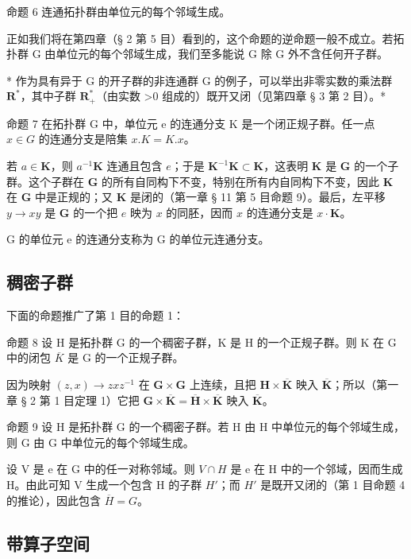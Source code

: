 命题 6 连通拓扑群由单位元的每个邻域生成。

正如我们将在第四章（§ 2 第 5 目）看到的，这个命题的逆命题一般不成立。若拓扑群 G 由单位元的每个邻域生成，我们至多能说 G 除 G 外不含任何开子群。

* 作为具有异于 G 的开子群的非连通群 G 的例子，可以举出非零实数的乘法群 \(\mathbf{R}^{*}\)，其中子群 \(\mathbf{R}_{+}^{*}\)（由实数 \textgreater0 组成的）既开又闭（见第四章 § 3 第 2 目）。*

命题 7 在拓扑群 G 中，单位元 e 的连通分支 K 是一个闭正规子群。任一点 \(x \in G\) 的连通分支是陪集 \(x.K = K.x\)。

若 \(a \in \mathbf{K}\)，则 \(a^{-1}\mathbf{K}\) 连通且包含 \(e\)；于是 \(\mathbf{K}^{-1}\mathbf{K} \subset \mathbf{K}\)，这表明 \(\mathbf{K}\) 是 \(\mathbf{G}\) 的一个子群。这个子群在 \(\mathbf{G}\) 的所有自同构下不变，特别在所有内自同构下不变，因此 \(\mathbf{K}\) 在 \(\mathbf{G}\) 中是正规的；又 \(\mathbf{K}\) 是闭的（第一章 § 11 第 5 目命题 9）。最后，左平移 \(y \to xy\) 是 \(\mathbf{G}\) 的一个把 \(e\) 映为 \(x\) 的同胚，因而 \(x\) 的连通分支是 \(x\cdot \mathbf{K}\)。

G 的单位元 e 的连通分支称为 G 的单位元连通分支。

\subsection{稠密子群}

下面的命题推广了第 1 目的命题 1：

命题 8 设 H 是拓扑群 G 的一个稠密子群，K 是 H 的一个正规子群。则 K 在 G 中的闭包 \(\overline{K}\) 是 G 的一个正规子群。

因为映射 \((z, x) \to zxz^{-1}\) 在 \(\mathbf{G} \times \mathbf{G}\) 上连续，且把 \(\mathbf{H} \times \overline{\mathbf{K}}\) 映入 \(\overline{\mathbf{K}}\)；所以（第一章 § 2 第 1 目定理 1）它把 \(\mathbf{G} \times \overline{\mathbf{K}} = \overline{\mathbf{H}} \times \overline{\mathbf{K}}\) 映入 \(\overline{\mathbf{K}}\)。

命题 9 设 H 是拓扑群 G 的一个稠密子群。若 H 由 H 中单位元的每个邻域生成，则 G 由 G 中单位元的每个邻域生成。

设 V 是 e 在 G 中的任一对称邻域。则 \(V \cap H\) 是 e 在 H 中的一个邻域，因而生成 H。由此可知 V 生成一个包含 H 的子群 \(H'\)；而 \(H'\) 是既开又闭的（第 1 目命题 4 的推论），因此包含 \(\overline{H} = G\)。

\subsection{带算子空间}


